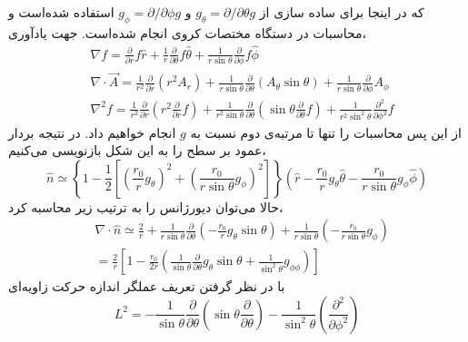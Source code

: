 که در اینجا برای ساده سازی از
$g_\theta=\partial/\partial\theta g$
و
$g_\phi=\partial/\partial\phi g$
استفاده شده‌است و محاسبات در دستگاه مختصات کروی انجام شده‌است.
جهت یادآوری،
\begin{equation}
\begin{aligned}
&\nabla f =\frac{\partial}{\partial r}f\hat r + \frac{1}{r} \frac{\partial}{\partial\theta}f\hat\theta+ \frac{1}{r\sin\theta} \frac{\partial}{\partial\phi}f\hat\phi\\
&\nabla\cdot \vec A =\frac{1}{r^2}\frac{\partial}{\partial r}(r^2A_r)+ \frac{1}{r\sin\theta} \frac{\partial}{\partial\theta}(A_\theta\sin\theta)+ \frac{1}{r\sin\theta} \frac{\partial}{\partial\phi}A_\phi\\
&\nabla^2f =\frac{1}{r^2}\frac{\partial}{\partial r}\left(r^2\frac{\partial}{\partial r}f\right)+ \frac{1}{r^2\sin\theta} \frac{\partial}{\partial\theta}\left(\sin\theta\frac{\partial}{\partial\theta}f\right)+ \frac{1}{r^2\sin^2\theta} \frac{\partial^2}{\partial\phi^2}f
\end{aligned}
\end{equation}
از این پس محاسبات را تنها تا مرتبه‌ی دوم نسبت به $g$ 
انجام خواهیم داد. در نتیجه بردار عمود بر سطح را به این شکل بازنویسی می‌کنیم،
\begin{equation}
\hat n \simeq\left\{1-\frac{1}{2}\left[\left(\frac{r_0}{r}g_\theta\right)^2+\left(\frac{r_0}{r\sin\theta}g_\phi\right)^2 \right]\right\}\left( \hat r-\frac{r_0}{r}g_\theta \hat\theta-\frac{r_0}{r\sin\theta}g_\phi\hat\phi \right)
\end{equation}
حالا می‌توان دیورژانس را به ترتیب زیر محاسبه کرد،
\begin{equation}
\begin{aligned}
&\nabla\cdot\hat n \simeq \frac{2}{r}+\frac{1}{r\sin\theta}\frac{\partial}{\partial\theta}\left(-\frac{r_0}{r}g_\theta\sin\theta\right)+\frac{1}{r\sin\theta}\left(-\frac{r_0}{r\sin\theta}g_\phi\right)\\
&=\frac{2}{r}\left[1-\frac{r_0}{2r}\left(\frac{1}{\sin\theta}\frac{\partial}{\partial\theta}g_\theta\sin\theta+\frac{1}{\sin^2\theta}g_{\phi\phi}\right)\right]
\label{eq:divn}
\end{aligned}
\end{equation}
با در نظر گرفتن تعریف عملگر اندازه حرکت زاویه‌ای 
\begin{equation}
L^2=-\frac{1}{\sin\theta}\frac{\partial}{\partial\theta}\left(\sin\theta\frac{\partial}{\partial\theta}\right)-\frac{1}{\sin^2\theta}\left(\frac{\partial^2}{\partial\phi^2}\right)
\end{equation}
